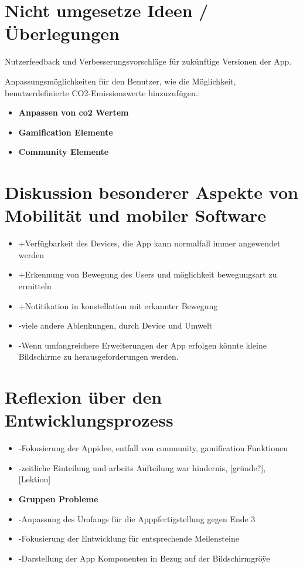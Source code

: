 \documentclass{article}
\begin{document}
\section{Nicht umgesetze Ideen / Überlegungen}

    Nutzerfeedback und Verbesserungsvorschläge für zukünftige Versionen der App.
    
    
    Anpassungsmöglichkeiten für den Benutzer, wie die Möglichkeit, benutzerdefinierte CO2-Emissionswerte hinzuzufügen.:
    
    \begin{itemize}
    \item \textbf{Anpassen von co2 Wertem}
    \item \textbf{Gamification Elemente}
    \item \textbf{Community Elemente}

    \end{itemize}
    
    
\section{Diskussion besonderer Aspekte von Mobilität und
mobiler Software}
\begin{itemize}
\item +Verfügbarkeit des Devices, die App kann normalfall immer angewendet werden
\item +Erkennung von Bewegung des Users und möglichkeit bewegungsart zu ermitteln
\item +Notitikation in konstellation mit erkannter Bewegung
\item -viele andere Ablenkungen, durch Device und Umwelt
\item -Wenn umfangreichere Erweiterungen der App erfolgen könnte kleine Bildschirme zu herausgeforderungen werden.
\end{itemize}
    
   

\section{Reflexion über den Entwicklungsprozess}
 \begin{itemize}
    \item -Fokusierung der Appidee, entfall von community, gamification Funktionen
	\item -zeitliche Einteilung und arbeits Aufteilung war hindernis,         [gründe?], [Lektion]
	\item \textbf{Gruppen Probleme}
	\item -Anpassung des Umfangs für die Apppfertigstellung gegen Ende 3
 	\item -Fokusierung der Entwicklung für entsprechende Meilensteine
	\item -Darstellung der App Komponenten in Bezug auf der Bildschirmgröÿe
    
  \end{itemize}
  
\end{document}
